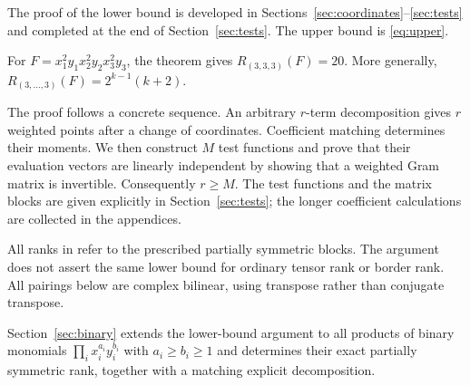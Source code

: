 The proof of the lower bound is developed in Sections~\ref{sec:coordinates}--\ref{sec:tests}
and completed at the end of Section~\ref{sec:tests}. The upper bound is
\eqref{eq:upper}.

\begin{example}\label{ex:rank20}
For $F=x_1^2y_1x_2^2y_2x_3^2y_3$, the theorem gives
$R_{(3,3,3)}(F)=20$. More generally,
$R_{(3,\ldots,3)}(F)=2^{k-1}(k+2)$.
\end{example}

The proof follows a concrete sequence. An arbitrary $r$-term
decomposition gives $r$ weighted points after a change of coordinates.
Coefficient matching determines their moments. We then construct $M$
test functions and prove that their evaluation vectors are linearly
independent by showing that a weighted Gram matrix is invertible.
Consequently $r\ge M$. The test functions and the matrix blocks are given
explicitly in Section~\ref{sec:tests}; the longer coefficient calculations
are collected in the appendices.

All ranks in  refer to the prescribed partially symmetric
blocks. The argument does not assert the same lower bound for ordinary
tensor rank or border rank. All pairings below are complex bilinear,
using transpose rather than conjugate transpose.

Section~\ref{sec:binary} extends the lower-bound argument to all
products of binary monomials $\prod_i x_i^{a_i}y_i^{b_i}$ with
$a_i\ge b_i\ge1$ and determines their exact partially symmetric rank,
together with a matching explicit decomposition.
